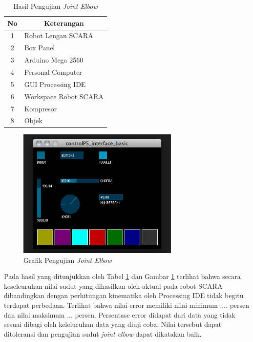  \begin{table}[H]
 	\centering
 	\caption{Hasil Pengujian \textit{Joint Elbow}}
 	\label{tbl.jointelbow}
 	\begin{tabular}{|c|l|}
 		\hline
 		\rowcolor[HTML]{9B9B9B} 
 		
 		No & \multicolumn{1}{c|}{\cellcolor[HTML]{9B9B9B}Keterangan} \\ \hline
 		1  & Robot Lengan SCARA                                      \\ \hline
 		2  & Box Panel                                               \\ \hline
 		3  & Arduino Mega 2560                                       \\ \hline
 		4  & Personal Computer                                       \\ \hline
 		5  & GUI Processing IDE                                      \\ \hline
 		6  & Workspace Robot SCARA                                   \\ \hline
 		7  & Kompresor                                               \\ \hline
 		8  & Objek                                                   \\ \hline
 	\end{tabular}
 	
 \end{table} 
 \begin{figure}[H]
 	\centering
 	\includegraphics[width=8cm]{gambar/controlp5.jpg}
 	\caption{Grafik Pengujian \textit{Joint Elbow}}
 	\label{pic.jointelbow}
 \end{figure}
 
 Pada hasil yang ditunjukkan oleh Tabel \ref{tbl.jointelbow} dan Gambar \ref{pic.jointelbow} terlihat bahwa secara keseleuruhan nilai sudut yang dihasilkan oleh aktual pada robot SCARA dibandingkan dengan perhitungan kinematika oleh Processing IDE tidak begitu terdapat perbedaan. Terlihat bahwa nilai error
 memiliki nilai minimum .... persen dan nilai maksimum ... persen. Persentase error didapat dari data yang tidak sesuai dibagi oleh keleluruhan data yang diuji coba. Nilai tersebut dapat ditoleransi dan pengujian sudut \textit{joint elbow} dapat dikatakan baik.
